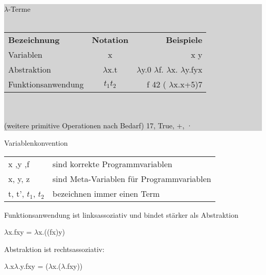 \documentclass[10pt]{article}
\begin{document}
\subitem\colorbox{lightgray}{
  \begin{minipage}[h]{0.9\linewidth}
    $\lambda$-Terme\\ \\
    \begin{tabular}[h]{lcr}
      \textbf {Bezeichnung} & \textbf{Notation} & \textbf{Beispiele}                                            \\
      Variablen             & x                 & x \enspace y                                                  \\
      Abstraktion           & $\lambda$x.t      & $\lambda$y.0 \enspace  $\lambda$f. $\lambda$x. $\lambda$y.fyx \\
      Funktionsanwendung    & $t_1t_2$          & f 42 \enspace ( $\lambda$x.x+5)7
    \end{tabular}
    \\\\
    (weitere primitive Operationen nach Bedarf) 17, True, +, ·		
  \end{minipage}
}


Variablenkonvention
\begin{tabular}[h]{ll}
  x ,y ,f             & \enspace \enspace sind korrekte Programmvariablen           \\
  x, y, z             & \enspace \enspace sind Meta-Variablen für Programmvariablen \\
  t, t', $t_1$, $t_2$ & \enspace  \enspace bezeichnen immer einen Term
  
\end{tabular}

Funktionsanwendung ist linksassoziativ und bindet stärker als Abstraktion

\begin{center}
  $\lambda$x.fxy = $\lambda$x.((fx)y)
\end{center}
Abstraktion ist rechtsassoziativ: 

\begin{center}
  $\lambda$.x$\lambda$.y.fxy = ($\lambda$x.($\lambda$.fxy))
\end{center}
\end{document}
